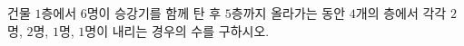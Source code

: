 \hspace*{2mm}\begin{minipage}[t]{\dimexpr\linewidth-2mm\relax}\vspace{0pt}
건물 $1$층에서 $6$명이 승강기를 함께 탄 후 $5$층까지 올라가는 동안 $4$개의 층에서 각각 $2$명, $2$명, $1$명, $1$명이 내리는 경우의 수를 구하시오. \end{minipage}
